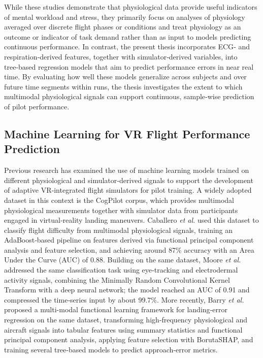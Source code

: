 \documentclass[11pt, a4paper]{article}
\begin{document}
While these studies demonstrate that physiological data provide useful indicators of mental workload and stress, they primarily focus on analyses of physiology averaged over discrete flight phases or conditions and treat physiology as an outcome or indicator of task demand rather than as input to models predicting continuous performance. In contrast, the present thesis incorporates ECG‑ and respiration‑derived features, together with simulator‑derived variables, into tree‑based regression models that aim to predict performance errors in near real time. By evaluating how well these models generalize across subjects and over future time segments within runs, the thesis investigates the extent to which multimodal physiological signals can support continuous, sample‑wise prediction of pilot performance.

\subsection{Machine Learning for VR Flight Performance Prediction}
Previous research has examined the use of machine learning models trained on different physiological and simulator‑derived signals to support the development of adaptive VR‑integrated flight simulators for pilot training. A widely adopted dataset in this context is the CogPilot \cite{rao-2022} corpus, which provides multimodal physiological measurements together with simulator data from participants engaged in virtual‑reality landing maneuvers. Caballero \emph{et al.} \cite{caballero-2023} used this dataset to classify flight difficulty from multimodal physiological signals, training an AdaBoost‑based pipeline on features derived via functional principal component analysis and feature selection, and achieving around 87\% accuracy with an Area Under the Curve (AUC) of 0.88. Building on the same dataset, Moore \emph{et al.} \cite{moore-2023} addressed the same classification task using eye‑tracking and electrodermal activity signals, combining the Minimally Random Convolutional Kernel Transform with a deep neural network; the model reached an AUC of 0.91 and compressed the time‑series input by about 99.7\%. More recently, Barry \emph{et al.} \cite{barry-2025} proposed a multi-modal functional learning framework for landing‑error regression on the same dataset, transforming high‑frequency physiological and aircraft signals into tabular features using summary statistics and functional principal component analysis, applying feature selection with BorutaSHAP, and training several tree‑based models to predict approach‑error metrics.
\end{document}
